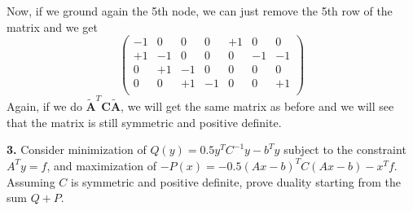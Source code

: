 \documentclass{article}
\newcommand{\mA}{\mathbf{A}}
\newcommand{\mC}{\mathbf{C}}
\begin{document}
{\begin{itemize}
        Now, if we ground again the 5th node, we can just remove the 5th row of the matrix and we get
        \[
            \begin{pmatrix}
            -1 & 0 & 0 & 0 & +1 & 0 & 0 \\
            +1 & -1 & 0 & 0 & 0 & -1 & -1 \\
            0 & +1 & -1 & 0 & 0 & 0 & 0  \\
            0 & 0 & +1 & -1 & 0 & 0 & +1 \\
            \end{pmatrix}
        \]
        Again, if we do $\tilde{\mA}^T \mC \tilde{\mA}$, we will get the same matrix as before and we will see that the matrix is still symmetric and positive definite.
    \end{itemize}
}

\vspace{0.5cm}

\noindent \textbf{3.} Consider minimization of $Q(y) = 0.5 y^T C^{-1} y - b^T y$ subject to the constraint $A^T y = f$, and maximization of $-P(x) = -0.5 (A x - b)^T C (A x - b) - x^T f$. Assuming $C$ is symmetric and positive definite, prove duality starting from the sum $Q + P$.
\end{document}
